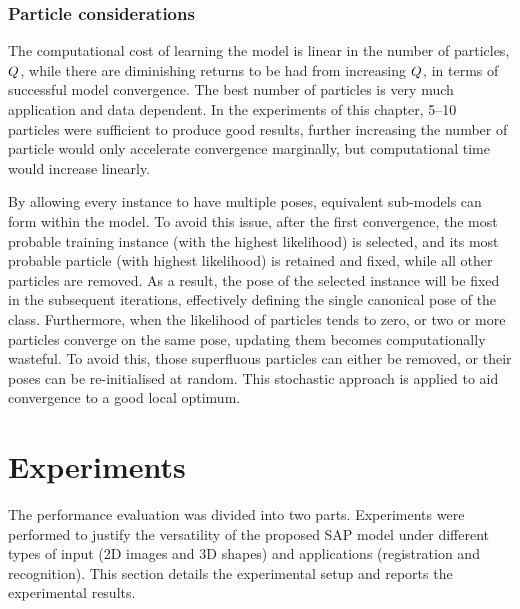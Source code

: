 \subsubsection{Particle considerations}
The computational cost of learning the model is linear in the number of particles, $Q$, while there are diminishing returns to be had from increasing $Q$, in terms of successful model convergence. The best number of particles is very much application and data dependent. In the experiments of this chapter, 5--10 particles were sufficient to produce good results, further increasing the number of particle would only accelerate convergence marginally, but computational time would increase linearly. 

By allowing every instance to have multiple poses, equivalent sub-models can form within the model.
To avoid this issue, after the first convergence, the most probable training instance (with the highest likelihood) is selected, and its most probable particle (with highest likelihood) is retained and fixed, while all other particles are removed. As a result, the pose of the selected instance will be fixed in the subsequent iterations, effectively defining the single canonical pose of the class. 
Furthermore, when the likelihood of particles tends to zero, or two or more particles converge on the same pose, updating them becomes computationally wasteful. To avoid this, those superfluous particles can either be removed, or their poses can be re-initialised at random. This stochastic approach is applied to aid convergence to a good local optimum.  


\section{Experiments}
\label{sec/reg/experiments}



The performance evaluation was divided into two parts. Experiments were performed to justify the versatility of the proposed SAP model under different types of input (2D images and 3D shapes) and applications (registration and recognition). This section details the experimental setup and reports the experimental results.

